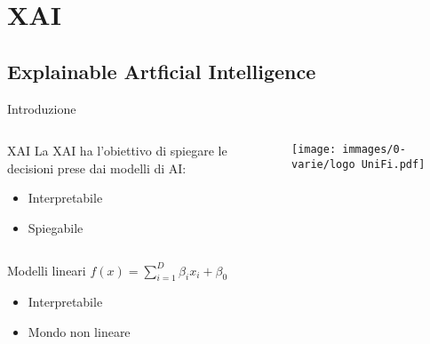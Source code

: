 \section{XAI}

\subsection{Explainable Artficial Intelligence}

\begin{frame}{Introduzione}
    \begin{columns}
        \begin{column}{.45\textwidth}
            \begin{block}{XAI}
                La XAI ha l'obiettivo di spiegare le decisioni prese dai modelli di AI:
                \begin{itemize}
                    \item Interpretabile
                    \item Spiegabile
                \end{itemize}
            \end{block}
        \end{column}
        \begin{column}{.45\textwidth}
            \texttt{[image: immages/0-varie/logo UniFi.pdf]}
        \end{column}
    \end{columns}
    \pause
    \vfill
    \begin{block}{Modelli lineari}
        $f(x)=\sum_{i=1}^D\beta_ix_i+\beta_0$
        \begin{itemize}
            \item Interpretabile
            \item Mondo non lineare
        \end{itemize}
    \end{block}
    \vfill
\end{frame}